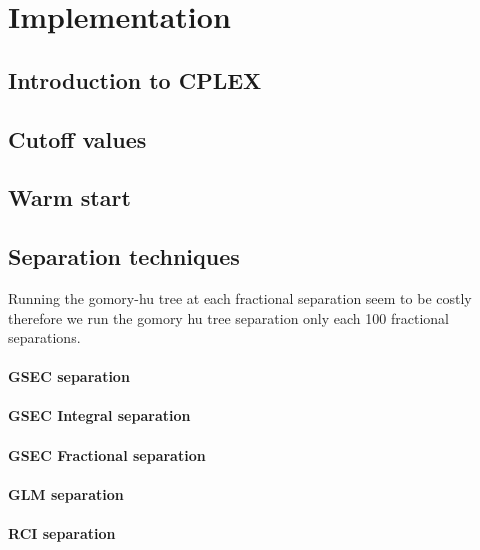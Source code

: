 \chapter{Implementation}


\section{Introduction to CPLEX}


\section{Cutoff values}

\section{Warm start}

\section{Separation techniques}


Running the gomory-hu tree at each fractional separation seem to be costly therefore we run the gomory hu tree
separation only each 100 fractional separations.

\subsubsection{GSEC separation}

\subsubsection{GSEC Integral separation}

\subsubsection{GSEC Fractional separation}

\subsubsection{GLM separation}

\subsubsection{RCI separation}
